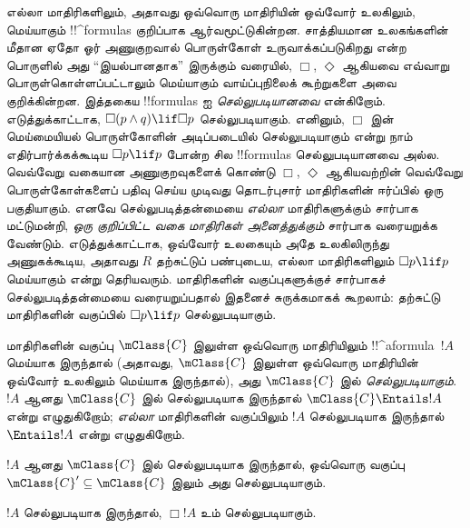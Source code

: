 \documentclass[../../../include/open-logic-section]{subfiles}
\begin{document}


\begin{explain}
  எல்லா மாதிரிகளிலும், அதாவது ஒவ்வொரு மாதிரியின் ஒவ்வோர் உலகிலும்,
  மெய்யாகும் !!^{formula}s குறிப்பாக ஆர்வமூட்டுகின்றன. சாத்தியமான
  உலகங்களின் மீதான ஏதோ ஓர் அணுகுறவால் பொருள்கோள் உருவாக்கப்படுகிறது என்ற
  பொருளில் அது ``இயல்பானதாக'' இருக்கும் வரையில், $\Box$, $\Diamond$
  ஆகியவை எவ்வாறு பொருள்கொள்ளப்பட்டாலும் மெய்யாகும் வாய்ப்புநிலைக்
  கூற்றுகளை அவை குறிக்கின்றன. இத்தகைய !!{formula}s ஐ
  \emph{செல்லுபடியானவை} என்கிறோம். எடுத்துக்காட்டாக, $\Box(p \land q)
  \lif \Box p$ செல்லுபடியாகும். எனினும், $\Box$ இன் மெய்மையியல்
  பொருள்கோளின் அடிப்படையில் செல்லுபடியாகும் என்று நாம் எதிர்பார்க்கக்கூடிய
  $\Box p \lif p$ போன்ற சில !!{formula}s செல்லுபடியானவை அல்ல. வெவ்வேறு
  வகையான அணுகுறவுகளைக் கொண்டு $\Box$, $\Diamond$ ஆகியவற்றின் வெவ்வேறு
  பொருள்கோள்களைப் பதிவு செய்ய முடிவது தொடர்புசார் மாதிரிகளின் ஈர்ப்பில்
  ஒரு பகுதியாகும். எனவே செல்லுபடித்தன்மையை \emph{எல்லா} மாதிரிகளுக்கும்
  சார்பாக மட்டுமன்றி, \emph{ஒரு குறிப்பிட்ட வகை மாதிரிகள் அனைத்துக்கும்}
  சார்பாக வரையறுக்க வேண்டும். எடுத்துக்காட்டாக, ஒவ்வோர் உலகையும் அதே
  உலகிலிருந்து அணுகக்கூடிய, அதாவது $R$ தற்சுட்டுப் பண்புடைய, எல்லா மாதிரிகளிலும்
  $\Box p \lif p$ மெய்யாகும் என்று தெரியவரும். மாதிரிகளின் வகுப்புகளுக்குச்
  சார்பாகச் செல்லுபடித்தன்மையை வரையறுப்பதால் இதனைச் சுருக்கமாகக் கூறலாம்:
  தற்சுட்டு மாதிரிகளின் வகுப்பில் $\Box p \lif p$ செல்லுபடியாகும்.
\end{explain}

\begin{defn}
  மாதிரிகளின் வகுப்பு $\mClass{C}$ இலுள்ள ஒவ்வொரு மாதிரியிலும்
  !!^a{formula}~$!A$ மெய்யாக இருந்தால் (அதாவது, $\mClass{C}$ இலுள்ள
  ஒவ்வொரு மாதிரியின் ஒவ்வோர் உலகிலும் மெய்யாக இருந்தால்), அது
  $\mClass{C}$ இல் \emph{செல்லுபடியாகும்}. $!A$ ஆனது $\mClass{C}$ இல்
  செல்லுபடியாக இருந்தால் $\mClass{C} \Entails !A$ என்று எழுதுகிறோம்;
  \emph{எல்லா} மாதிரிகளின் வகுப்பிலும் $!A$ செல்லுபடியாக இருந்தால்
  $\Entails !A$ என்று எழுதுகிறோம்.
\end{defn}

\begin{prop}
  $!A$ ஆனது $\mClass{C}$ இல் செல்லுபடியாக இருந்தால், ஒவ்வொரு வகுப்பு
  $\mClass{C}' \subseteq \mClass{C}$ இலும் அது செல்லுபடியாகும்.
\end{prop}

\begin{prop}
  $!A$ செல்லுபடியாக இருந்தால், $\Box!A$ உம் செல்லுபடியாகும்.
\end{prop}
\end{document}
